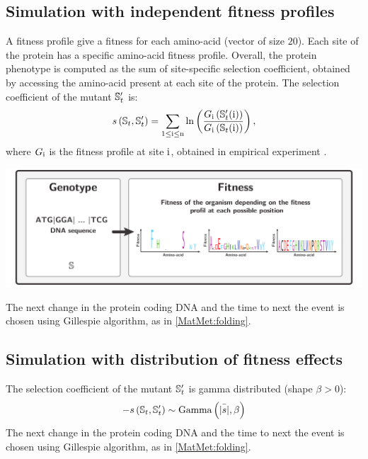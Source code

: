 \documentclass{article}
\begin{document}
\subsection{Simulation with independent fitness profiles}
A fitness profile give a fitness for each amino-acid (vector of size $20$).
Each site of the protein has a specific amino-acid fitness profile.
Overall, the protein phenotype is computed as the sum of site-specific selection coefficient, obtained by accessing the amino-acid present at each site of the protein.
The selection coefficient of the mutant $\mathbb{S}_{t}'$ is:
\begin{equation}
s \left( \mathbb{S}_{t},\mathbb{S}_{t}'\right) = \sum_{1 \leq \text{i} \leq \text{n}} \ln \left( \dfrac{G_{\text{i}} \left(\mathbb{S}_{t}'(\text{i}) \right)}{G_{\text{i}} \left(\mathbb{S}_{t}(\text{i}) \right)} \right) ,
\end{equation}
where $G_{\text{i}}$ is the fitness profile at site $\text{i}$, obtained in empirical experiment \cite{Bloom2017}.
\begin{center}
	\includegraphics[width=165mm] {artworks/ModelSimuDiv.pdf}
\end{center}

The next change in the protein coding DNA and the time to next the event is chosen using Gillespie algorithm, as in \ref{MatMet:folding}.

\subsection{Simulation with distribution of fitness effects}
The selection coefficient of the mutant $\mathbb{S}_{t}'$ is gamma distributed (shape $\beta > 0$):
\begin{equation}
- s \left( \mathbb{S}_{t},\mathbb{S}_{t}'\right) \sim \text{Gamma} \left( \bar{|s|}, \beta \right)
\end{equation}
The next change in the protein coding DNA and the time to next the event is chosen using Gillespie algorithm, as in \ref{MatMet:folding}.
\end{document}
